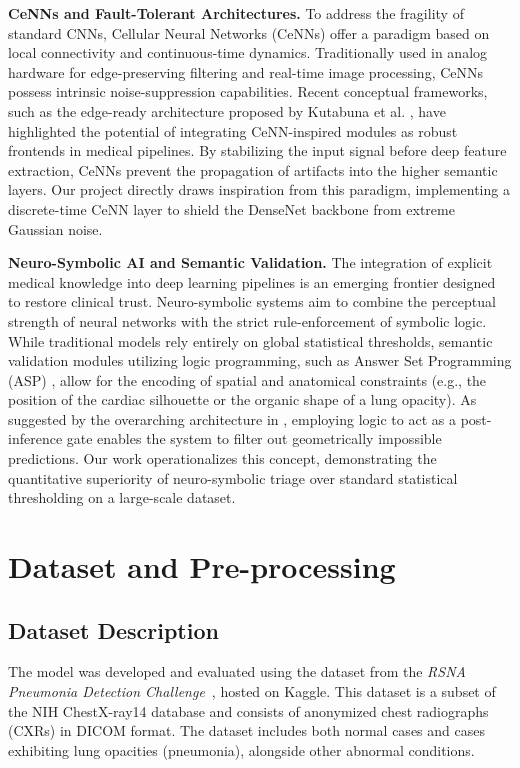 \documentclass[a4paper,fleqn]{cas-dc}
\begin{document}
\textbf{CeNNs and Fault-Tolerant Architectures.} To address the fragility of standard CNNs, Cellular Neural Networks (CeNNs) \cite{CeNN} offer a paradigm based on local connectivity and continuous-time dynamics. Traditionally used in analog hardware for edge-preserving filtering and real-time image processing, CeNNs possess intrinsic noise-suppression capabilities. Recent conceptual frameworks, such as the edge-ready architecture proposed by Kutabuna et al. \cite{kubakisa20XXnoisy}, have highlighted the potential of integrating CeNN-inspired modules as robust frontends in medical pipelines. By stabilizing the input signal before deep feature extraction, CeNNs prevent the propagation of artifacts into the higher semantic layers. Our project directly draws inspiration from this paradigm, implementing a discrete-time CeNN layer to shield the DenseNet backbone from extreme Gaussian noise.

\textbf{Neuro-Symbolic AI and Semantic Validation.} The integration of explicit medical knowledge into deep learning pipelines is an emerging frontier designed to restore clinical trust. Neuro-symbolic systems aim to combine the perceptual strength of neural networks with the strict rule-enforcement of symbolic logic. While traditional models rely entirely on global statistical thresholds, semantic validation modules utilizing logic programming, such as Answer Set Programming (ASP) \cite{asp}, allow for the encoding of spatial and anatomical constraints (e.g., the position of the cardiac silhouette or the organic shape of a lung opacity). As suggested by the overarching architecture in \cite{kubakisa20XXnoisy}, employing logic to act as a post-inference gate enables the system to filter out geometrically impossible predictions. Our work operationalizes this concept, demonstrating the quantitative superiority of neuro-symbolic triage over standard statistical thresholding on a large-scale dataset.

\section{Dataset and Pre-processing}
\label{sec:dataset}

\subsection{Dataset Description}
The model was developed and evaluated using the dataset from the \textit{RSNA Pneumonia Detection Challenge}~\cite{rsna-pneumonia-detection-challenge}, hosted on Kaggle. This dataset is a subset of the NIH ChestX-ray14\cite{NIH-chest-xray} database and consists of anonymized chest radiographs (CXRs) in DICOM format. The dataset includes both normal cases and cases exhibiting lung opacities (pneumonia), alongside other abnormal conditions.
\end{document}
